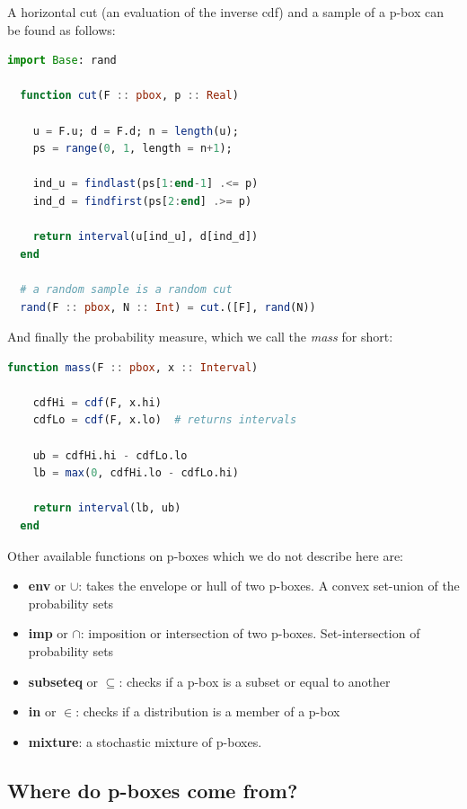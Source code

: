 \documentclass{juliacon}
\begin{document}
A horizontal cut (an evaluation of the inverse cdf) and a sample of a p-box can be found as follows: 

\begin{lstlisting}[language = Julia]
  import Base: rand

  function cut(F :: pbox, p :: Real)

    u = F.u; d = F.d; n = length(u);
    ps = range(0, 1, length = n+1);

    ind_u = findlast(ps[1:end-1] .<= p)
    ind_d = findfirst(ps[2:end] .>= p)
    
    return interval(u[ind_u], d[ind_d])
  end

  # a random sample is a random cut
  rand(F :: pbox, N :: Int) = cut.([F], rand(N))

\end{lstlisting}

And finally the probability measure, which we call the \textit{mass} for short:

\begin{lstlisting}[language = Julia]
  function mass(F :: pbox, x :: Interval)

    cdfHi = cdf(F, x.hi)  
    cdfLo = cdf(F, x.lo)  # returns intervals

    ub = cdfHi.hi - cdfLo.lo
    lb = max(0, cdfHi.lo - cdfLo.hi)

    return interval(lb, ub)
  end

\end{lstlisting}

Other available functions on p-boxes which we do not describe here are:

\begin{itemize}
  \item \textbf{env} or $\cup$: takes the envelope or hull of two p-boxes. A convex set-union of the probability sets
  \item \textbf{imp} or $\cap$: imposition or intersection of two p-boxes. Set-intersection of probability sets
  \item \textbf{subseteq} or $\subseteq$: checks if a p-box is a subset or equal to another
  \item \textbf{in} or $\in$: checks if a distribution is a member of a p-box
  \item \textbf{mixture}: a stochastic mixture of p-boxes.
\end{itemize}

\subsection{Where do p-boxes come from?}
\end{document}
